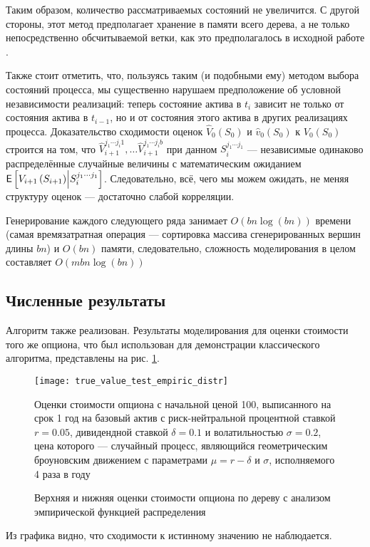 		\par Таким образом, количество рассматриваемых состояний не увеличится. С другой стороны, этот метод предполагает хранение в памяти всего дерева, а не только непосредственно обсчитываемой ветки, как это предполагалось в исходной работе \cite{Broadie1997}.
		\par Также стоит отметить, что, пользуясь таким (и подобными ему) методом выбора состояний процесса, мы существенно нарушаем предположение об условной независимости реализаций: теперь состояние актива в $t_i$ зависит не только от состояния актива в $t_{i-1}$, но и от состояния этого актива в других реализациях процесса. Доказательство сходимости оценок $\hat{V}_0(S_0)$ и $\hat{v}_0(S_0)$ к $V_0(S_0)$ строится на том, что $\hat{V}_{i+1}^{j_1\cdots j_i 1}, \ldots \hat{V}_{i+1}^{j_1\cdots j_i b}$ при данном $S_i^{j_1\cdots j_1}$ --- независимые одинаково распределённые случайные величины с математическим ожиданием $\mathsf{E}\left[V_{i+1}\left(S_{i+1}\right)\middle\vert S_i^{j_1\cdots j_1}\right]$. Следовательно, всё, чего мы можем ожидать, не меняя структуру оценок --- достаточно слабой корреляции.
		\par Генерирование каждого следующего ряда занимает $O\left(bn\log\left(bn\right)\right)$ времени (самая времязатратная операция --- сортировка массива сгенерированных вершин длины $bn$) и $O\left(bn\right)$ памяти, следовательно, сложность моделирования в целом составляет $O\left(mbn\log\left(bn\right)\right)$
	\subsection{Численные результаты}
		Алгоритм также реализован. Результаты моделирования для оценки стоимости того же опциона, что был использован для демонстрации классического алгоритма, представлены на рис. \ref{fig:true_value_test_empiric_distr}.
		\begin{figure}[h]
    	    \centering
    		\texttt{[image: true\_value\_test\_empiric\_distr]}
    		\caption{Верхняя и нижняя оценки стоимости опциона по дереву с анализом эмпирической функцией распределения}
    		\label{fig:true_value_test_empiric_distr}
    		\footnotesize{Оценки стоимости опциона с начальной ценой 100, выписанного на срок 1 год на базовый актив с риск-нейтральной процентной ставкой $r = 0.05$, дивидендной ставкой $\delta = 0.1$ и волатильностью $\sigma=0.2$, цена которого --- случайный процесс, являющийся геометрическим броуновским движением с параметрами $\mu = r - \delta$ и $\sigma$, исполняемого 4 раза в году}
	    \end{figure}
		Из графика видно, что сходимости к истинному значению не наблюдается.
